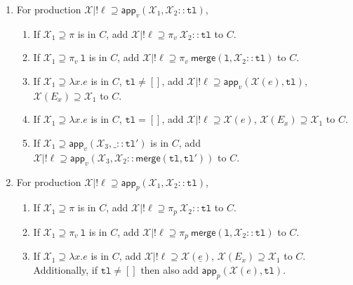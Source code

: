\documentclass[a4paper]{article}
\newcommand*\vbar{|}
\begin{document}
\begin{enumerate}
    \item For production $\mathcal{X}\vbar!\ell\supseteq\mathsf{app}_v(\mathcal{X_1},\mathcal{X_2} :: \mathtt{tl})$,
    \begin{enumerate}
        \item If $\mathcal{X_1}\supseteq\pi$ is in $C$, add $\mathcal{X}\vbar!\ell\supseteq\pi_v\:\mathcal{X_2}::\mathtt{tl}$ to $C$.
        \item If $\mathcal{X_1}\supseteq\pi_v\:\mathtt{l}$ is in $C$, add $\mathcal{X}\vbar!\ell\supseteq\pi_v\:\mathsf{merge}(\mathtt{l},\mathcal{X_2}::\mathtt{tl})$ to $C$.
        \item If $\mathcal{X_1}\supseteq \lambda x.e$ is in $C$, $\mathtt{tl}\neq[]$, add $\mathcal{X}\vbar!\ell\supseteq\mathsf{app}_v(\mathcal{X}(e),\mathtt{tl})$, $\mathcal{X}(E_x)\supseteq\mathcal{X_1}$ to $C$.
        \item If $\mathcal{X_1}\supseteq \lambda x.e$ is in $C$, $\mathtt{tl}=[]$, add $\mathcal{X}\vbar!\ell\supseteq \mathcal{X}(e)$, $\mathcal{X}(E_x)\supseteq\mathcal{X_1}$ to $C$.
        \item If $\mathcal{X_1}\supseteq\mathsf{app}_v(\mathcal{X}_3,\_::\mathtt{tl}')$ is in $C$, add $\mathcal{X}\vbar!\ell\supseteq\mathsf{app}_v(\mathcal{X}_3,\mathcal{X_2}::\mathsf{merge}(\mathtt{tl},\mathtt{tl}'))$ to $C$.
    \end{enumerate}
    \item For production $\mathcal{X}\vbar!\ell\supseteq\mathsf{app}_p(\mathcal{X}_1,\mathcal{X}_2::\mathtt{tl})$,
    \begin{enumerate}
        \item If $\mathcal{X_1}\supseteq\pi$ is in $C$, add $\mathcal{X}\vbar!\ell\supseteq\pi_p\:\mathcal{X_2}::\mathtt{tl}$ to $C$.
        \item If $\mathcal{X_1}\supseteq\pi_v\:\mathtt{l}$ is in $C$, add $\mathcal{X}\vbar!\ell\supseteq\pi_p\:\mathsf{merge}(\mathtt{l},\mathcal{X_2}::\mathtt{tl})$ to $C$.
        \item If $\mathcal{X_1}\supseteq \lambda x.e$ is in $C$, add $\mathcal{X}\vbar!\ell\supseteq \mathcal{X}(\underline{e})$,
        $\mathcal{X}(E_x)\supseteq\mathcal{X_1}$ to $C$.
        Additionally, if $\texttt{tl} \ne []$ then also add $\mathsf{app}_p(\mathcal{X}(e),\mathtt{tl})$.

\end{enumerate}
\end{enumerate}
\end{document}

